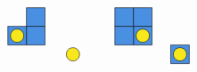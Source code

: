\documentclass[12pt]{article}
\begin{document}
\[\begin{tikzpicture}[x=0.75pt,y=0.75pt,yscale=-1,xscale=1]
    \draw  [fill={rgb, 255:red, 74; green, 144; blue, 226 }  ,fill opacity=1 ] (306,137.37) -- (326,137.37) -- (326,157.37) -- (306,157.37) -- cycle ;
    \draw  [fill={rgb, 255:red, 74; green, 144; blue, 226 }  ,fill opacity=1 ] (306,157.37) -- (326,157.37) -- (326,177.37) -- (306,177.37) -- cycle ;
    \draw  [fill={rgb, 255:red, 74; green, 144; blue, 226 }  ,fill opacity=1 ] (286,157.37) -- (306,157.37) -- (306,177.37) -- (286,177.37) -- cycle ;
    \draw  [fill={rgb, 255:red, 248; green, 231; blue, 28 }  ,fill opacity=1 ] (288.87,167.37) .. controls (288.87,163.43) and (292.06,160.24) .. (296,160.24) .. controls (299.94,160.24) and (303.13,163.43) .. (303.13,167.37) .. controls (303.13,171.31) and (299.94,174.5) .. (296,174.5) .. controls (292.06,174.5) and (288.87,171.31) .. (288.87,167.37) -- cycle ;
    \draw  [fill={rgb, 255:red, 248; green, 231; blue, 28 }  ,fill opacity=1 ] (348.87,187.37) .. controls (348.87,183.43) and (352.06,180.24) .. (356,180.24) .. controls (359.94,180.24) and (363.13,183.43) .. (363.13,187.37) .. controls (363.13,191.31) and (359.94,194.5) .. (356,194.5) .. controls (352.06,194.5) and (348.87,191.31) .. (348.87,187.37) -- cycle ;
    \draw  [fill={rgb, 255:red, 74; green, 144; blue, 226 }  ,fill opacity=1 ] (461,177.37) -- (481,177.37) -- (481,197.37) -- (461,197.37) -- cycle ;
    \draw  [fill={rgb, 255:red, 74; green, 144; blue, 226 }  ,fill opacity=1 ] (401,137.37) -- (421,137.37) -- (421,157.37) -- (401,157.37) -- cycle ;
    \draw  [fill={rgb, 255:red, 74; green, 144; blue, 226 }  ,fill opacity=1 ] (421,137.37) -- (441,137.37) -- (441,157.37) -- (421,157.37) -- cycle ;
    \draw  [fill={rgb, 255:red, 74; green, 144; blue, 226 }  ,fill opacity=1 ] (421,157.37) -- (441,157.37) -- (441,177.37) -- (421,177.37) -- cycle ;
    \draw  [fill={rgb, 255:red, 74; green, 144; blue, 226 }  ,fill opacity=1 ] (401,157.37) -- (421,157.37) -- (421,177.37) -- (401,177.37) -- cycle ;
    \draw  [fill={rgb, 255:red, 248; green, 231; blue, 28 }  ,fill opacity=1 ] (423.87,167.37) .. controls (423.87,163.43) and (427.06,160.24) .. (431,160.24) .. controls (434.94,160.24) and (438.13,163.43) .. (438.13,167.37) .. controls (438.13,171.31) and (434.94,174.5) .. (431,174.5) .. controls (427.06,174.5) and (423.87,171.31) .. (423.87,167.37) -- cycle ;
    \draw  [fill={rgb, 255:red, 248; green, 231; blue, 28 }  ,fill opacity=1 ] (463.87,187.37) .. controls (463.87,183.43) and (467.06,180.24) .. (471,180.24) .. controls (474.94,180.24) and (478.13,183.43) .. (478.13,187.37) .. controls (478.13,191.31) and (474.94,194.5) .. (471,194.5) .. controls (467.06,194.5) and (463.87,191.31) .. (463.87,187.37) -- cycle ;
    

\end{tikzpicture}\]
\end{document}
